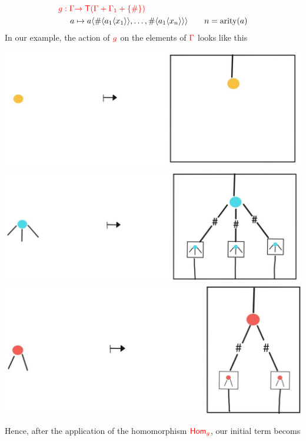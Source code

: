 \begin{example}
\begin{enumerate}
\begin{align*}
{\color{red}{g: \Gamma}} & {\color{red}{\to  {\color{red}{\mathsf T}}(\Gamma+\Gamma_1+\{\#\} )}}\\
      a & \mapsto a\langle{\#\langle{a_1\langle{x_1}\rangle}\rangle,\dots, \#\langle{a_1\langle{x_n}\rangle}\rangle}\rangle\qquad n=\mathrm{arity}(a)
\end{align*}
In our example, the action of ${\color{red}{g}}$ on the elements of ${\color{red}{\Gamma}}$ looks like this
\begin{center}
		\includegraphics[scale=.1]{MyPic3a.jpg}\includegraphics[scale=.1]{MyPic3b.jpg}\includegraphics[scale=.1]{MyPic3c.jpg}
		\end{center}
Hence, after the application of the homomorphism ${\color{red}{\mathsf{Hom}_g}}$, our initial term becoms
\begin{center}

\end{center}
\end{enumerate}
\end{example}
